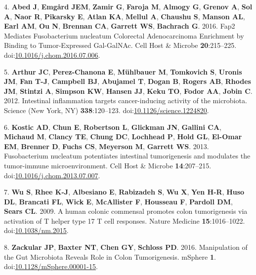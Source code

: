 \documentclass[12pt,]{article}
\begin{document}
\hypertarget{ref-abed_fap2_2016}{}
4. \textbf{Abed J}, \textbf{Emgård JEM}, \textbf{Zamir G},
\textbf{Faroja M}, \textbf{Almogy G}, \textbf{Grenov A}, \textbf{Sol A},
\textbf{Naor R}, \textbf{Pikarsky E}, \textbf{Atlan KA}, \textbf{Mellul
A}, \textbf{Chaushu S}, \textbf{Manson AL}, \textbf{Earl AM}, \textbf{Ou
N}, \textbf{Brennan CA}, \textbf{Garrett WS}, \textbf{Bachrach G}. 2016.
Fap2 Mediates Fusobacterium nucleatum Colorectal Adenocarcinoma
Enrichment by Binding to Tumor-Expressed Gal-GalNAc. Cell Host \&
Microbe \textbf{20}:215--225.
doi:\href{https://doi.org/10.1016/j.chom.2016.07.006}{10.1016/j.chom.2016.07.006}.

\hypertarget{ref-arthur_intestinal_2012}{}
5. \textbf{Arthur JC}, \textbf{Perez-Chanona E}, \textbf{Mühlbauer M},
\textbf{Tomkovich S}, \textbf{Uronis JM}, \textbf{Fan T-J},
\textbf{Campbell BJ}, \textbf{Abujamel T}, \textbf{Dogan B},
\textbf{Rogers AB}, \textbf{Rhodes JM}, \textbf{Stintzi A},
\textbf{Simpson KW}, \textbf{Hansen JJ}, \textbf{Keku TO}, \textbf{Fodor
AA}, \textbf{Jobin C}. 2012. Intestinal inflammation targets
cancer-inducing activity of the microbiota. Science (New York, NY)
\textbf{338}:120--123.
doi:\href{https://doi.org/10.1126/science.1224820}{10.1126/science.1224820}.

\hypertarget{ref-kostic_fusobacterium_2013}{}
6. \textbf{Kostic AD}, \textbf{Chun E}, \textbf{Robertson L},
\textbf{Glickman JN}, \textbf{Gallini CA}, \textbf{Michaud M},
\textbf{Clancy TE}, \textbf{Chung DC}, \textbf{Lochhead P}, \textbf{Hold
GL}, \textbf{El-Omar EM}, \textbf{Brenner D}, \textbf{Fuchs CS},
\textbf{Meyerson M}, \textbf{Garrett WS}. 2013. Fusobacterium nucleatum
potentiates intestinal tumorigenesis and modulates the tumor-immune
microenvironment. Cell Host \& Microbe \textbf{14}:207--215.
doi:\href{https://doi.org/10.1016/j.chom.2013.07.007}{10.1016/j.chom.2013.07.007}.

\hypertarget{ref-wu_human_2009}{}
7. \textbf{Wu S}, \textbf{Rhee K-J}, \textbf{Albesiano E},
\textbf{Rabizadeh S}, \textbf{Wu X}, \textbf{Yen H-R}, \textbf{Huso DL},
\textbf{Brancati FL}, \textbf{Wick E}, \textbf{McAllister F},
\textbf{Housseau F}, \textbf{Pardoll DM}, \textbf{Sears CL}. 2009. A
human colonic commensal promotes colon tumorigenesis via activation of T
helper type 17 T cell responses. Nature Medicine \textbf{15}:1016--1022.
doi:\href{https://doi.org/10.1038/nm.2015}{10.1038/nm.2015}.

\hypertarget{ref-zackular_manipulation_2016}{}
8. \textbf{Zackular JP}, \textbf{Baxter NT}, \textbf{Chen GY},
\textbf{Schloss PD}. 2016. Manipulation of the Gut Microbiota Reveals
Role in Colon Tumorigenesis. mSphere \textbf{1}.
doi:\href{https://doi.org/10.1128/mSphere.00001-15}{10.1128/mSphere.00001-15}.
\end{document}
